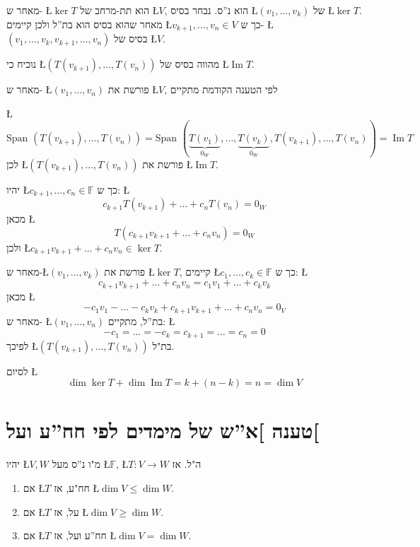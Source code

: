 \documentclass[english,hebrew]{article}
\newcommand{\spn}{\text{Span }}
\begin{document}
מאחר ש- \L{$\ker T$} הוא תת-מרחב של \L{$V$}, הוא נ\textquotedblright ס.
נבחר בסיס \L{$(v_{1},\dots,v_{k})$} של \L{$\ker T$}. מאחר שהוא בסיס
הוא בת\textquotedblright ל ולכן קיימים \L{$v_{k+1},\dots,v_{n}\in V$}
כך ש- \L{$(v_{1},\dots,v_{k},v_{k+1},\dots,v_{n})$} בסיס של \L{$V$}.

נוכיח כי \L{$(T(v_{k+1}),\dots,T(v_{n}))$} מהווה בסיס של \L{$\operatorname{Im}T$}.

מאחר ש- \L{$(v_{1},\dots,v_{n})$} פורשת את \L{$V$}, לפי הטענה הקודמת
מתקיים

\L{%
\[
\spn(T(v_{k+1}),\dots,T(v_{n}))=\spn(\underset{0_{W}}{\underbrace{T(v_{1})}},\dots,\underset{0_{W}}{\underbrace{T(v_{k})}},T(v_{k+1}),\dots,T(v_{n}))=\operatorname{Im}T
\]
}%
לכן \L{$(T(v_{k+1}),\dots,T(v_{n}))$} פורשת את \L{$\operatorname{Im}T$}.

יהיו \L{$c_{k+1},\dots,c_{n}\in\mathbb{F}$} כך ש: \L{%
\[
c_{k+1}T(v_{k+1})+\dots+c_{n}T(v_{n})=0_{W}
\]
}%
מכאן \L{%
\[
T(c_{k+1}v_{k+1}+\dots+c_{n}v_{n})=0_{W}
\]
}%
ולכן \L{$c_{k+1}v_{k+1}+\dots+c_{n}v_{n}\in\ker T$}.

מאחר ש-\L{$(v_{1},\dots,v_{k})$} פורשת את \L{$\ker T$}, קיימים \L{$c_{1},\dots,c_{k}\in\mathbb{F}$}
כך ש: \L{%
\[
c_{k+1}v_{k+1}+\dots+c_{n}v_{n}=c_{1}v_{1}+\dots+c_{k}v_{k}
\]
}%
מכאן \L{%
\[
-c_{1}v_{1}-\dots-c_{k}v_{k}+c_{k+1}v_{k+1}+\dots+c_{n}v_{n}=0_{V}
\]
}%
מאחר ש- \L{$(v_{1},\dots,v_{n})$} בת\textquotedblright ל, מתקיים:
\L{%
\[
-c_{1}=\dots=-c_{k}=c_{k+1}=\dots=c_{n}=0
\]
}%
לפיכך \L{$(T(v_{k+1}),\dots,T(v_{n}))$} בת"ל.

לסיום \L{%
\[
\dim\ker T+\dim\operatorname{Im}T=k+(n-k)=n=\dim V
\]
}%

\section{טענה {]}א\textquotedblright ש של מימדים לפי חח\textquotedblright ע
ועל{[}}

יהיו \L{$V,W$} מ"ו נ\textquotedblright ס מעל \L{$\mathbb{F}$},
\L{$T:V\to W$} ה"ל. אז
\begin{enumerate}
\item אם \L{$T$} חח"ע, אז \L{$\dim V\le\dim W$}. 
\item אם \L{$T$} על, אז \L{$\dim V\ge\dim W$}. 
\item אם \L{$T$} חח\textquotedblright ע ועל, אז \L{$\dim V=\dim W$}. 
\end{enumerate}
\end{document}
